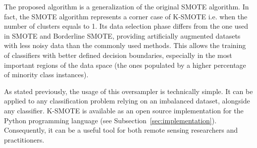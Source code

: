 \documentclass[remotesensing,article,submit,moreauthors,pdftex]{Definitions/mdpi}
\begin{document}
\begin{paracol}{2}
The proposed algorithm is a generalization of the original SMOTE algorithm. In
fact, the SMOTE algorithm represents a corner case of K-SMOTE i.e. when the
number of clusters equals to 1. Its data selection phase differs from the one
used in SMOTE and Borderline SMOTE, providing artificially augmented datasets
with less noisy data than the commonly used methods. This allows the training
of classifiers with better defined decision boundaries, especially in the most
important regions of the data space (the ones populated by a higher percentage
of minority class instances).

As stated previously, the usage of this oversampler is technically simple. It
can be applied to any classification problem relying on an imbalanced dataset,
alongside any classifier. K-SMOTE is available as an open source implementation
for the Python programming language (see Subsection~\ref{sec:implementation}).
Consequently, it can be a useful tool for both remote sensing researchers and
practitioners.





\end{paracol}

\end{document}
